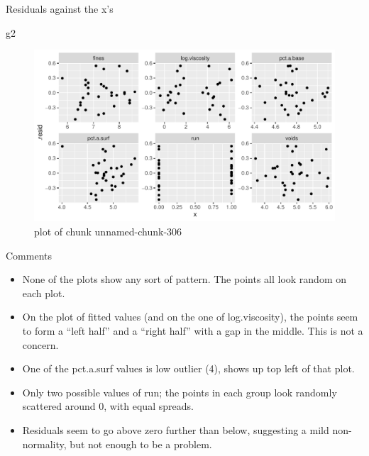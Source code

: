 \documentclass[ignorenonframetext,]{beamer}
\newenvironment{Shaded}{\begin{snugshade}}{\end{snugshade}}
\newcommand{\NormalTok}[1]{#1}
\providecommand{\tightlist}{%
  \setlength{\itemsep}{0pt}\setlength{\parskip}{0pt}}
\begin{document}
\begin{frame}[fragile]{Residuals against the x's}
\protect\hypertarget{residuals-against-the-xs}{}

\begin{Shaded}
\begin{Highlighting}[]
\NormalTok{g2}
\end{Highlighting}
\end{Shaded}

\begin{figure}
\centering
\includegraphics{figure/unnamed-chunk-306-1.pdf}
\caption{plot of chunk unnamed-chunk-306}
\end{figure}

\end{frame}

\begin{frame}{Comments}
\protect\hypertarget{comments-24}{}

\begin{itemize}
\tightlist
\item
  None of the plots show any sort of pattern. The points all look random
  on each plot.
\item
  On the plot of fitted values (and on the one of log.viscosity), the
  points seem to form a ``left half'' and a ``right half'' with a gap in
  the middle. This is not a concern.
\item
  One of the pct.a.surf values is low outlier (4), shows up top left of
  that plot.
\item
  Only two possible values of run; the points in each group look
  randomly scattered around 0, with equal spreads.
\item
  Residuals seem to go above zero further than below, suggesting a mild
  non-normality, but not enough to be a problem.
\end{itemize}

\end{frame}
\end{document}
